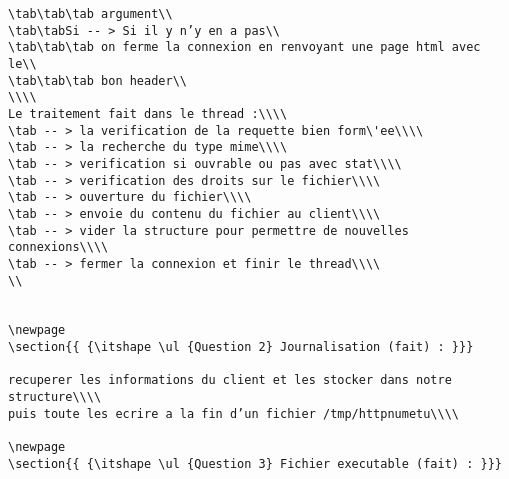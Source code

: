 \documentclass[final,twoside,onecolumn,10pt]{article}
\newcommand\tab[1][1cm]{\hspace*{#1}}
\begin{document}
\begin {verbatim}
\tab\tab\tab argument\\
\tab\tabSi -- > Si il y n’y en a pas\\
\tab\tab\tab on ferme la connexion en renvoyant une page html avec le\\
\tab\tab\tab bon header\\
\\\\
Le traitement fait dans le thread :\\\\
\tab -- > la verification de la requette bien form\'ee\\\\
\tab -- > la recherche du type mime\\\\
\tab -- > verification si ouvrable ou pas avec stat\\\\
\tab -- > verification des droits sur le fichier\\\\
\tab -- > ouverture du fichier\\\\
\tab -- > envoie du contenu du fichier au client\\\\
\tab -- > vider la structure pour permettre de nouvelles connexions\\\\
\tab -- > fermer la connexion et finir le thread\\\\
\\


\newpage
\section{{ {\itshape \ul {Question 2} Journalisation (fait) : }}}

recuperer les informations du client et les stocker dans notre structure\\\\
puis toute les ecrire a la fin d’un fichier /tmp/httpnumetu\\\\

\newpage
\section{{ {\itshape \ul {Question 3} Fichier executable (fait) : }}}


\end{verbatim}
\end{document}

